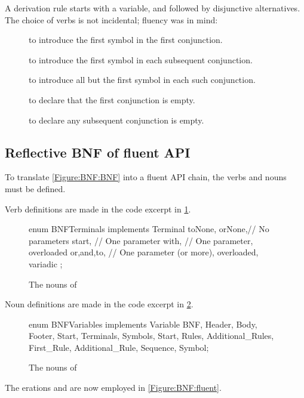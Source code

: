 A derivation rule starts with a variable, and followed by disjunctive alternatives.
The choice of verbs is not incidental; fluency was in mind:
\begin{description}
  \item[] to introduce the first symbol in the first conjunction.
  \item[] to introduce the first symbol in each subsequent conjunction.
  \item[] to introduce all but the first symbol in each such conjunction.
  \item[] to declare that the first conjunction is empty.
  \item[] to declare any subsequent conjunction is empty.
\end{description}

\subsection{Reflective BNF of fluent API}

To translate \cref{Figure:BNF:BNF} into a fluent
API chain, the verbs and nouns must be defined.

Verb definitions are made in the code excerpt in
\cref{Figure:Verbs}.

\begin{figure}[H]
  \begin{JAVA}[style=code]
enum BNFTerminals implements Terminal {
  toNone, orNone,// No parameters
  start,         // One parameter 
  with,          // One parameter, overloaded 
  or,and,to,     // One parameter (or more), overloaded, variadic 
  ;
} \end{JAVA}
  \caption{The nouns of \SELF}
  \label{Figure:Verbs}
\end{figure}

Noun definitions are made in the code excerpt in \cref{Figure:Nouns}.

\begin{figure}[H]
  \begin{JAVA}[style=code]
enum BNFVariables implements Variable {
  BNF, Header, Body, Footer,
  Start, Terminals, Symbols,
  Start, Rules, Additional_Rules,
  First_Rule, Additional_Rule,
  Sequence, Symbol;
}\end{JAVA}
  \caption{The nouns of \SELF}
  \label{Figure:Nouns}
\end{figure}

The
erations  and
  are now employed in \cref{Figure:BNF:fluent}.


